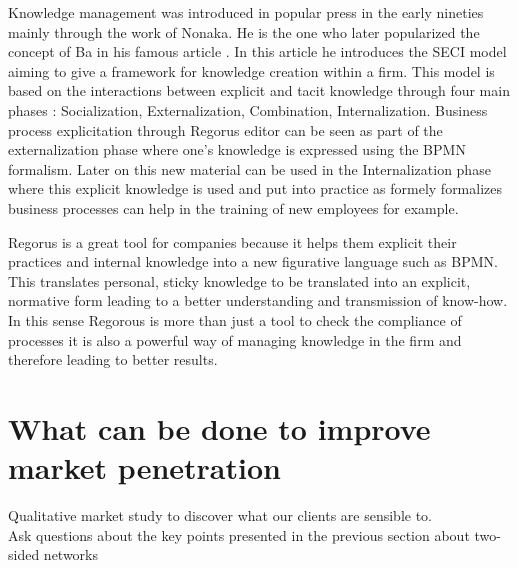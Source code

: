 \documentclass[10pt]{report}
\begin{document}
Knowledge management was introduced in popular press in the early nineties mainly through the work of Nonaka. \autocite{nonaka1991knowledge} He is the one who later popularized the concept of Ba in his famous article \autocite{Nonaka_Konno_1998}. In this article he introduces the SECI model aiming to give a framework for knowledge creation within a firm. This model is based on the interactions between explicit and tacit knowledge through four main phases : Socialization, Externalization, Combination, Internalization. Business process explicitation through Regorus editor can be seen as part of the externalization phase where one's knowledge is expressed using the BPMN formalism. Later on this new material can be used in the Internalization phase where this explicit knowledge is used and put into practice as formely formalizes business processes can help in the training of new employees for example.

Regorus is a great tool for companies because it helps them explicit their practices and internal knowledge into a new figurative language such as BPMN. This translates personal, sticky knowledge to be translated into an explicit, normative form leading to a better understanding and transmission of know-how. In this sense Regorous is more than just a tool to check the compliance of processes it is also a powerful way of managing knowledge in the firm and therefore leading to better results.

\section{What can be done to improve market penetration}
Qualitative market study to discover what our clients are sensible to.\\
Ask questions about the key points presented in the previous section about two-sided networks


\newpage


\newpage

\pagestyle{plain}

\nocite{*}
\setlength{\bibitemsep}{5pt}
\printbibliography[title={Book references},type=book]
\printbibliography[title={Article references},type=article]
\printbibliography[title={Online references},type=online]

\printbibliography[title={Other references}, nottype=online,nottype=article, nottype=book]
\end{document}
